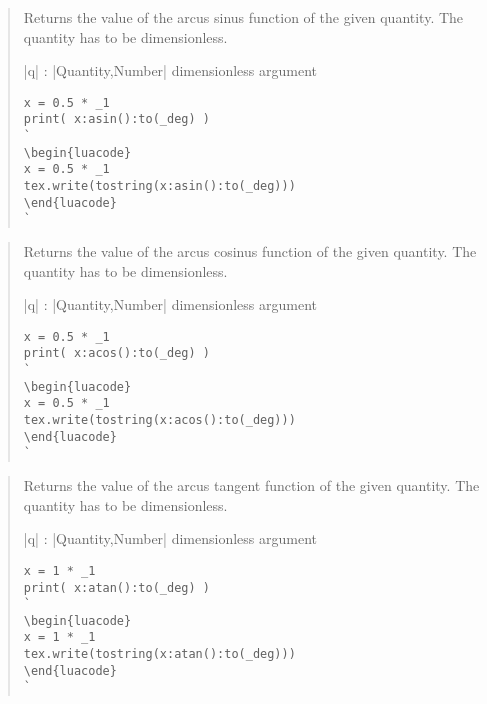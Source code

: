 \documentclass{ltxdoc}
\begin{document}
\begin{quote}
  Returns the value of the arcus sinus function of the given quantity. The quantity has to be dimensionless.

  \begin{description}
  \item |q| : |Quantity,Number| dimensionless argument
  \end{description}

\begin{lstlisting}
x = 0.5 * _1
print( x:asin():to(_deg) )
`
\begin{luacode}
x = 0.5 * _1
tex.write(tostring(x:asin():to(_deg)))
\end{luacode}
`
\end{lstlisting}

\end{quote}



\begin{quote}
  Returns the value of the arcus cosinus function of the given quantity. The quantity has to be dimensionless.

  \begin{description}
  \item |q| : |Quantity,Number| dimensionless argument
  \end{description}

\begin{lstlisting}
x = 0.5 * _1
print( x:acos():to(_deg) )
`
\begin{luacode}
x = 0.5 * _1
tex.write(tostring(x:acos():to(_deg)))
\end{luacode}
`
\end{lstlisting}

\end{quote}




\begin{quote}
  Returns the value of the arcus tangent function of the given quantity. The quantity has to be dimensionless.

  \begin{description}
  \item |q| : |Quantity,Number| dimensionless argument
  \end{description}

\begin{lstlisting}
x = 1 * _1
print( x:atan():to(_deg) )
`
\begin{luacode}
x = 1 * _1
tex.write(tostring(x:atan():to(_deg)))
\end{luacode}
`
\end{lstlisting}

\end{quote}
\end{document}
